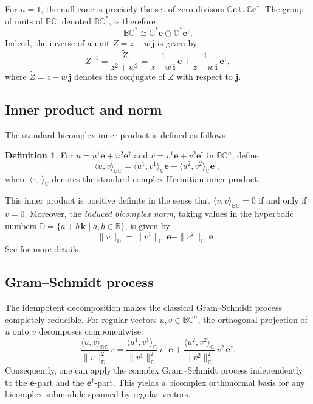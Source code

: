 \documentclass[11pt]{amsart}
\newcommand{\BC}{\mathbb{BC}}       %
\newcommand{\C}{\mathbb{C}}          %
\newcommand{\R}{\mathbb{R}}
\newcommand{\D}{\mathbb{D}}
\newcommand{\e}{\mathbf{e}}          %
\newcommand{\ed}{\mathbf{e}^\dagger} %
\newcommand{\iunit}{\mathbf{i}}      %
\newcommand{\junit}{\mathbf{j}}      %
\newcommand{\kunit}{\mathbf{k}}      %
\theoremstyle{definition}
\newtheorem{defn}[prop]{Definition}       %
\begin{document}
For $n=1$, the null cone is precisely the set of zero divisors $\C\e \cup \C\ed$. The group of units of $\BC$, denoted $\BC^*$, is therefore
\begin{equation*}
    \BC^* \cong \C^*\e \oplus \C^*\ed.
\end{equation*}
Indeed, the inverse of a unit $Z = z + w\,\junit$ is given by
\begin{equation*}
    Z^{-1} = \frac{\widetilde{Z}}{z^2 + w^2}
            = \frac{1}{z - w\,\iunit}\,\e + \frac{1}{z + w\,\iunit}\,\ed,
\end{equation*}
where $\widetilde{Z} = z - w\,\junit$ denotes the conjugate of $Z$ with respect to $\junit$.

\subsection{Inner product and norm}

The standard bicomplex inner product is defined as follows.

\begin{defn}\label{def:inner-product}
    For $u = u^1\e + u^2\ed$ and $v = v^1\e + v^2\ed$ in $\BC^n$, define
    \begin{equation*}
        \langle u, v \rangle_{\BC}
        = \langle u^1, v^1 \rangle_{\C} \e
          + \langle u^2, v^2 \rangle_{\C} \ed,
    \end{equation*}
    where $\langle \cdot, \cdot \rangle_{\C}$ denotes the standard complex Hermitian inner product.
\end{defn}

This inner product is positive definite in the sense that $\langle v, v \rangle_{\BC} = 0$ if and only if $v = 0$. Moreover, the \emph{induced bicomplex norm}, taking values in the hyperbolic numbers $\D = \{ a + b\,\kunit \mid a,b \in \R \}$, is given by
\begin{equation*}
    \| v \|_{\D} = \| v^1 \|_{\C}\,\e + \| v^2 \|_{\C}\,\ed. 
\end{equation*}
See \cite{Banerjee2019} for more details.
\subsection{Gram--Schmidt process}\label{subsec:gram-schmidt}

The idempotent decomposition makes the classical Gram--Schmidt process completely reducible. For regular vectors $u, v \in \BC^n$, the orthogonal projection of $u$ onto $v$ decomposes componentwise:
\begin{equation*}
    \frac{\langle u, v \rangle_{\BC}}{\|v\|^2_{\D}} \, v
    =
    \frac{\langle u^1, v^1 \rangle_{\C}}{\|v^1\|^2_{\C}} \, v^1\,\e
    +
    \frac{\langle u^2, v^2 \rangle_{\C}}{\|v^2\|^2_{\C}} \, v^2\,\ed.
\end{equation*}
Consequently, one can apply the complex Gram--Schmidt process independently to the $\e$-part and the $\ed$-part. This yields a bicomplex orthonormal basis for any bicomplex submodule spanned by regular vectors.
\end{document}
